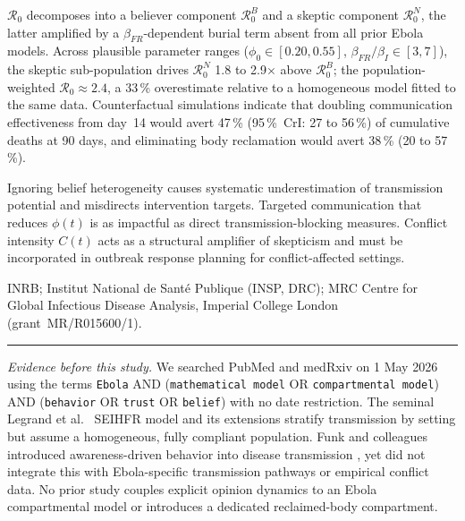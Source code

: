 \documentclass[12pt,a4paper]{article}
\begin{document}
\smallskip{}
$\mathcal{R}_0$ decomposes into a believer component $\mathcal{R}_0^B$
and a skeptic component $\mathcal{R}_0^N$, the latter amplified by a
$\beta_{FR}$-dependent burial term absent from all prior Ebola models. Across
plausible parameter ranges ($\phi_0 \in [0.20,0.55]$,
$\beta_{FR}/\beta_I \in [3,7]$), the skeptic sub-population drives
$\mathcal{R}_0^N$ 1.8 to 2.9$\times$ above $\mathcal{R}_0^B$; the
population-weighted $\mathcal{R}_0 \approx 2.4$, a 33\,\% overestimate
relative to a homogeneous model fitted to the same data. Counterfactual
simulations indicate that doubling communication effectiveness from day~14
would avert 47\,\% (95\,\%~CrI: 27 to 56\,\%) of cumulative deaths at 90
days, and eliminating body reclamation would avert 38\,\% (20 to 57\,\%).

\smallskip{}
Ignoring belief heterogeneity causes systematic underestimation of
transmission potential and misdirects intervention targets. Targeted
communication that reduces $\phi(t)$ is as impactful as direct
transmission-blocking measures. Conflict intensity $C(t)$ acts as a
structural amplifier of skepticism and must be incorporated in outbreak
response planning for conflict-affected settings.

\smallskip{}
INRB; Institut National de Santé Publique (INSP, DRC); MRC Centre for
Global Infectious Disease Analysis, Imperial College London
(grant~MR/R015600/1).

\vspace{0.5em}\hrule\vspace{1em}


\noindent\textit{Evidence before this study.}
We searched PubMed and medRxiv on 1 May 2026 using the terms
\texttt{Ebola} AND (\texttt{mathematical model} OR \texttt{compartmental
model}) AND (\texttt{behavior} OR \texttt{trust} OR \texttt{belief}) with
no date restriction. The seminal Legrand et al.\ \citep{Legrand2007} SEIHFR
model and its extensions \citep{Chowell2004,Lewnard2014} stratify transmission
by setting but assume a homogeneous, fully compliant population. Funk and
colleagues introduced awareness-driven behavior into disease transmission
\citep{Funk2009,Funk2010}, yet did not integrate this with Ebola-specific
transmission pathways or empirical conflict data. No prior study couples
explicit opinion dynamics to an Ebola compartmental model or introduces a
dedicated reclaimed-body compartment.
\end{document}
